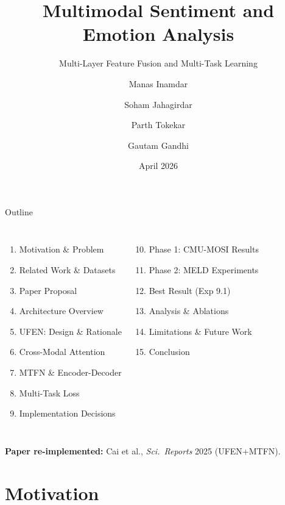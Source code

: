 \documentclass[aspectratio=169,10pt]{beamer}
\title{Multimodal Sentiment and Emotion Analysis}
\subtitle{Multi-Layer Feature Fusion and Multi-Task Learning}
\author{Manas Inamdar \and Soham Jahagirdar \and Parth Tokekar \and Gautam Gandhi}
\institute{Team TokeNization \\ Introduction to NLP (S26) --- Final Submission}
\date{April 2026}
\begin{document}
\begin{frame}
  \titlepage
\end{frame}

\begin{frame}{Outline}
  \begin{columns}[t]
    \begin{enumerate}
      \item Motivation \& Problem
      \item Related Work \& Datasets
      \item Paper Proposal
      \item Architecture Overview
      \item UFEN: Design \& Rationale
      \item Cross-Modal Attention
      \item MTFN \& Encoder-Decoder
      \item Multi-Task Loss
      \item Implementation Decisions
    \end{enumerate}
    \begin{enumerate}
      \setcounter{enumi}{9}
      \item Phase 1: CMU-MOSI Results
      \item Phase 2: MELD Experiments
      \item Best Result (Exp 9.1)
      \item Analysis \& Ablations
      \item Limitations \& Future Work
      \item Conclusion
    \end{enumerate}
  \end{columns}
  \vfill
  \centering\small
  \textbf{Paper re-implemented:} Cai et al., \emph{Sci.\ Reports} 2025 (UFEN+MTFN).
\end{frame}

\section{Motivation}
\end{document}
